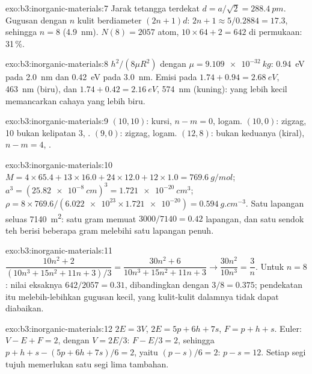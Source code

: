 \begin{solution}{exo:b3:inorganic-materials:7}
Jarak tetangga terdekat $d = a/\sqrt2 = \qty{288.4}{pm}$. Gugusan dengan $n$ kulit berdiameter $(2n + 1)d$:
$2n + 1 \approx 5/0.2884 = 17.3$, sehingga $n = 8$ (\qty{4.9}{nm}). $N(8) = 2057$ atom, $10 \times 64 + 2 = 642$ di permukaan:
31\,\%.
\end{solution}

\begin{solution}{exo:b3:inorganic-materials:8}
$h^2/(8\mu R^2)$ dengan $\mu = \qty{9.109e-32}{kg}$: \qty{0.94}{eV} pada \qty{2.0}{nm} dan \qty{0.42}{eV} pada \qty{3.0}{nm}. Emisi pada
$1.74 + 0.94 = \qty{2.68}{eV}$, \qty{463}{nm} (biru), dan $1.74 + 0.42 = \qty{2.16}{eV}$, \qty{574}{nm} (kuning):  yang lebih kecil
memancarkan cahaya yang lebih biru.
\end{solution}

\begin{solution}{exo:b3:inorganic-materials:9}
$(10, 10)$: kursi, $n - m = 0$, logam. $(10, 0)$: zigzag, 10 bukan kelipatan 3, .
$(9, 0)$: zigzag, logam. $(12, 8)$: bukan keduanya (kiral), $n - m = 4$, .
\end{solution}

\begin{solution}{exo:b3:inorganic-materials:10}
$M = 4 \times 65.4 + 13 \times 16.0 + 24 \times 12.0 + 12 \times 1.0 = \qty{769.6}{g/mol}$; $a^3 = (\qty{25.82e-8}{cm})^3 = \qty{1.721e-20}{cm^3}$;
$\rho = 8 \times 769.6/(\num{6.022e23} \times \num{1.721e-20}) = \qty{0.594}{g.cm^{-3}}$. Satu lapangan seluas \qty{7140}{m^2}: satu gram memuat
$3000/7140 = 0.42$ lapangan, dan satu sendok teh berisi beberapa gram melebihi satu lapangan penuh.
\end{solution}

\begin{solution}{exo:b3:inorganic-materials:11}
$\dfrac{10n^2 + 2}{(10n^3 + 15n^2 + 11n + 3)/3} = \dfrac{30n^2 + 6}{10n^3 + 15n^2 + 11n + 3} \to \dfrac{30n^2}{10n^3} = \dfrac3n$. Untuk $n = 8$: nilai eksaknya
$642/2057 = 0.31$, dibandingkan dengan $3/8 = 0.375$; pendekatan itu melebih-lebihkan gugusan
kecil, yang kulit-kulit dalamnya tidak dapat diabaikan.
\end{solution}

\begin{solution}{exo:b3:inorganic-materials:12}
$2E = 3V$, $2E = 5p + 6h + 7s$, $F = p + h + s$. Euler: $V - E + F = 2$, dengan $V = 2E/3$: $F - E/3 = 2$, sehingga
$p + h + s - (5p + 6h + 7s)/6 = 2$, yaitu $(p - s)/6 = 2$: $p - s = 12$. Setiap segi tujuh memerlukan satu segi lima
tambahan.
\end{solution}

